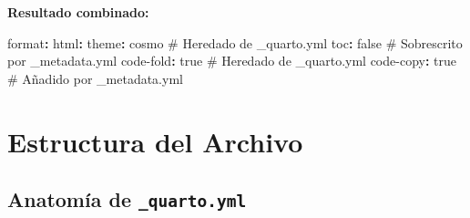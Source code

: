 \documentclass[
  doc,
  floatsintext,
  longtable,
  a4paper,
  nolmodern,
  notxfonts,
  notimes,
  12pt,
  colorlinks=true,linkcolor=blue,citecolor=blue,urlcolor=blue]{apa7}
\newenvironment{Shaded}{\begin{snugshade}}{\end{snugshade}}
\newcommand{\AttributeTok}[1]{\textcolor[rgb]{0.40,0.45,0.13}{#1}}
\newcommand{\CharTok}[1]{\textcolor[rgb]{0.13,0.47,0.30}{#1}}
\newcommand{\CommentTok}[1]{\textcolor[rgb]{0.37,0.37,0.37}{#1}}
\newcommand{\FunctionTok}[1]{\textcolor[rgb]{0.28,0.35,0.67}{#1}}
\newcommand{\KeywordTok}[1]{\textcolor[rgb]{0.00,0.23,0.31}{\textbf{#1}}}
\begin{document}
\textbf{Resultado combinado:}

\begin{Shaded}
\begin{Highlighting}[]
\FunctionTok{format}\KeywordTok{:}
\AttributeTok{  }\FunctionTok{html}\KeywordTok{:}
\AttributeTok{    }\FunctionTok{theme}\KeywordTok{:}\AttributeTok{ cosmo}\CommentTok{          \# Heredado de \_quarto.yml}
\AttributeTok{    }\FunctionTok{toc}\KeywordTok{:}\AttributeTok{ }\CharTok{false}\CommentTok{            \# Sobrescrito por \_metadata.yml}
\AttributeTok{    }\FunctionTok{code{-}fold}\KeywordTok{:}\AttributeTok{ }\CharTok{true}\CommentTok{       \# Heredado de \_quarto.yml}
\AttributeTok{    }\FunctionTok{code{-}copy}\KeywordTok{:}\AttributeTok{ }\CharTok{true}\CommentTok{       \# Añadido por \_metadata.yml}
\end{Highlighting}
\end{Shaded}

\section{Estructura del Archivo}\label{estructura-del-archivo}

\subsection{\texorpdfstring{Anatomía de
\texttt{\_quarto.yml}}{Anatomía de \_quarto.yml}}\label{anatomuxeda-de-_quarto.yml}
\end{document}
